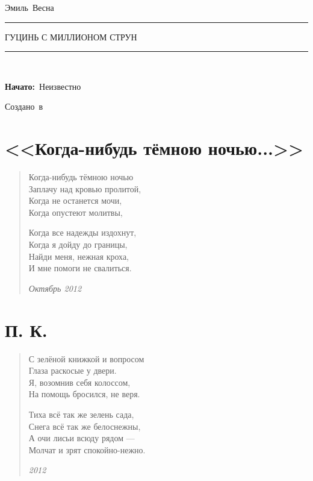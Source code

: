 \documentclass[a4paper,12pt,fleqn]{book}\usepackage{polyglossia}\setdefaultlanguage[babelshorthands=true]{russian}\setotherlanguage{english}\defaultfontfeatures{Ligatures=TeX,Mapping=tex-text}\usepackage{xcolor}\newcommand{\ml}[3]{#2}
\newcommand{\tofaauthor}{\ml{$0$}{Эмиль~Весна}{Emil~Viesn\'{a}}}
\newcommand{\tofatitle}{\ml{$0$}{ГУЦИНЬ С МИЛЛИОНОМ СТРУН}{The Million-Stringed Guqin}}
\newcommand{\tofastarted}{Неизвестно}
\newcommand{\asterism}{\vspace{1em}{\centering\Large\bfseries$\ast~\ast~\ast$\par}\vspace{1em}}
\begin{document}

\begin{titlepage}
{\centering{~\par}\vspace{0.25\textheight}
{\LARGE\tofaauthor}\par
\vspace{1.0cm}\rule{17em}{1pt}\par\vspace{0.3cm}
{\Huge\textsc{\tofatitle}\par}
\vspace{0.3cm}\rule{17em}{2pt}\par\vspace{1.0cm}
{\Large\textit{\ml{$0$}{~}{~}}\par}
\vspace{0.5cm}\asterism\par\vspace{1.0cm}
{\textbf{\ml{$0$}{Начато:}{Started:}}~\tofastarted\par}\vfill
{\Large\ml{$0$}{Создано~в}{Created~by}~\XeLaTeX}\par}
\end{titlepage}

\tableofcontents

\newpage

\section{<<Когда-нибудь тёмною ночью...>>}

\begin{verse}
Когда-нибудь тёмною ночью\\
Заплачу над кровью пролитой,\\
Когда не останется мочи,\\
Когда опустеют молитвы,

Когда все надежды издохнут,\\
Когда я дойду до границы,\\
Найди меня, нежная кроха,\\
И мне помоги не свалиться.

\emph{Октябрь 2012}
\end{verse}
\newpage

\section{П. К.}

\begin{verse}
С зелёной книжкой и вопросом\\
Глаза раскосые у двери.\\
Я, возомнив себя колоссом,\\
На помощь бросился, не веря.

Тиха всё так же зелень сада,\\
Снега всё так же белоснежны,\\
А очи лисьи всюду рядом ---\\
Молчат и зрят спокойно-нежно.

\emph{2012}
\end{verse}
\newpage
\end{document}
